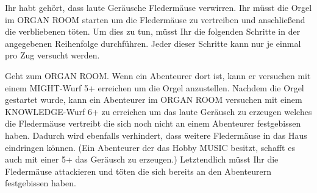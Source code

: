 





Ihr habt gehört, dass laute Geräusche Fledermäuse verwirren. Ihr müsst die Orgel im ORGAN ROOM starten um die Fledermäuse zu vertreiben und anschließend die verbliebenen töten. Um dies zu tun, müsst Ihr die folgenden Schritte in der angegebenen Reihenfolge durchführen. Jeder dieser Schritte kann nur je einmal pro Zug versucht werden.

  \begin{itemize}
        \bitem Geht zum ORGAN ROOM. Wenn ein Abenteurer dort ist, kann er versuchen mit einem MIGHT-Wurf 5+ erreichen um die Orgel anzustellen.
        \bitem Nachdem die Orgel gestartet wurde, kann ein Abenteurer im ORGAN ROOM versuchen mit einem KNOWLEDGE-Wurf 6+ zu erreichen um das laute Geräusch zu erzeugen welches die Fledermäuse vertreibt die sich noch nicht an einem Abenteurer festgebissen haben. Dadurch wird ebenfalls verhindert, dass weitere Fledermäuse in das Haus eindringen können. (Ein Abenteurer der das Hobby MUSIC besitzt, schafft es auch mit einer 5+ das Geräusch zu erzeugen.)
\newpage
        \bitem Letztendlich müsst Ihr die Fledermäuse attackieren und töten die sich bereits an den Abenteurern festgebissen haben.
    \end{itemize}


